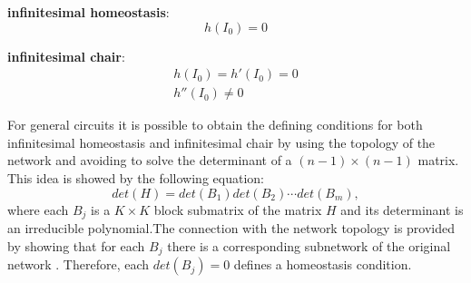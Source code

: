 \textbf{infinitesimal homeostasis}:
\begin{equation} \label{eq:mat-infinitesimal-condition}
    h(I_0) = 0
\end{equation}

\textbf{infinitesimal chair}:
\begin{equation} \label{eq:mat-chair-condition}
    \begin{aligned}
        h(I_0) = h'(I_0) = 0 \\
        h''(I_0) \neq 0
    \end{aligned}
\end{equation}

For general circuits it is possible to obtain the defining conditions for 
both infinitesimal homeostasis and infinitesimal chair by using the topology
of the network and avoiding to solve the determinant of a $(n-1)\times(n-1)$
matrix. This idea is showed by the following equation:
\begin{equation}
    det(H) = det(B_1)det(B_2)\cdots det(B_m),
\end{equation}
where each $B_j$ is a $K \times K$ block submatrix of the matrix $H$ and its 
determinant is an irreducible polynomial.The connection with the network 
topology is provided by showing that for each $B_j$ there is a corresponding 
subnetwork of the original network \cite{wang2021}. Therefore, each 
$det(B_j) = 0$ defines a homeostasis condition.